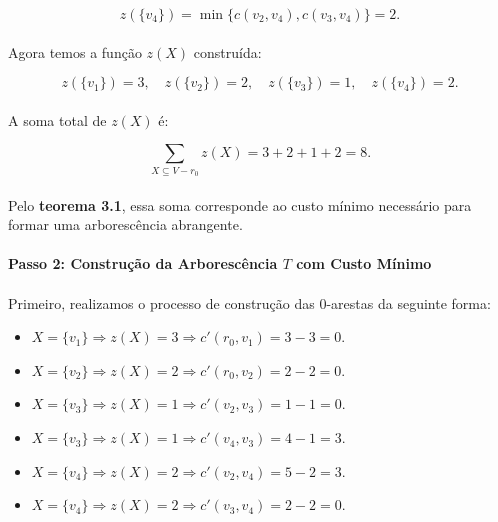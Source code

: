 \documentclass[12pt,a4paper]{article}
\begin{document}
\[
z(\{ v_4 \}) = \min \{ c(v_2, v_4), c(v_3, v_4) \} = 2.
\]
\paragraph{}
Agora temos a função \( z(X) \) construída:

\[
z(\{ v_1 \}) = 3, \quad z(\{ v_2 \}) = 2, \quad z(\{ v_3 \}) = 1, \quad z(\{ v_4 \}) = 2.
\]



\paragraph{}
A soma total de \( z(X) \) é:

\[
\sum_{X \subseteq V - r_0} z(X) = 3 + 2 + 1 + 2 = 8.
\]

\paragraph{}
Pelo \textbf{teorema 3.1}, essa soma corresponde ao custo mínimo necessário para formar uma arborescência abrangente.

\paragraph{}
\textbf{Passo 2: Construção da Arborescência \( T \) com Custo Mínimo}

\paragraph{}
Primeiro, realizamos o processo de construção das 0-arestas da seguinte forma:

\begin{itemize}
    \item \( X = \{ v_1 \} \Rightarrow z(X) = 3 \Rightarrow c'(r_0, v_1) = 3 - 3 = 0 \).
    \item \( X = \{ v_2 \} \Rightarrow z(X) = 2 \Rightarrow c'(r_0, v_2) = 2 - 2 = 0 \).
    \item \( X = \{ v_3 \} \Rightarrow z(X) = 1 \Rightarrow c'(v_2, v_3) = 1 - 1 = 0 \).
    \item \( X = \{ v_3 \} \Rightarrow z(X) = 1 \Rightarrow c'(v_4, v_3) = 4 - 1 = 3 \).
    \item \( X = \{ v_4 \} \Rightarrow z(X) = 2 \Rightarrow c'(v_2, v_4) = 5 - 2 = 3\).
    \item \( X = \{ v_4 \} \Rightarrow z(X) = 2 \Rightarrow c'(v_3, v_4) = 2 - 2 = 0 \).
\end{itemize}
\end{document}
